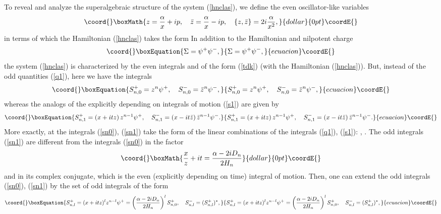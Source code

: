\documentclass[a4paper,12pt]{article}
\begin{document}
To reveal and analyze the superalgebraic structure of the
system (\ref{hnclas}), we define the even
oscillator-like variables
$$\coord{}\boxMath{
z=\frac{\alpha}{x}+ip,\quad
\bar z=\frac{\alpha}{x}-ip,\quad
\{z,\bar z\}=2i\frac{\alpha}{x^2},
}{dollar}{0pt}\coordE{}$$
in terms of which
the Hamiltonian (\ref{hnclas}) takes the form
\coordHE{}
In addition  to the Hamiltonian and nilpotent charge
\begin{equation}\coord{}\boxEquation{
\Sigma=\psi^+\psi^-,
\label{sigm}
}{
\Sigma=\psi^+\psi^-,
}{ecuacion}\coordE{}\end{equation}
the system (\ref{hnclas}) is characterized by the
even integrals \coordHE{} and \coordHE{} of the form
(\ref{tdk}) (with the Hamiltonian (\ref{hnclas})).
But, instead of the odd quantities (\ref{q1}),
here we have the integrals
\begin{equation}\coord{}\boxEquation{
S^+_{n,0}=z^n\psi^+,\quad S^-_{n,0}=
\bar z^n\psi^-,
\label{sn0}
}{
S^+_{n,0}=z^n\psi^+,\quad S^-_{n,0}=
\bar z^n\psi^-,
}{ecuacion}\coordE{}\end{equation}
whereas the analogs of
the explicitly depending on \coordHE{}
integrals of motion (\ref{s1})  are
given by
\begin{equation}\coord{}\boxEquation{
S^+_{n,1}=\left(x+itz\right)z^{n-1}\psi^+,\quad
S^-_{n,1}=\left(x-it\bar z \right)\bar{z}{}^{n-1}
\psi^-.
\label{sn1}
}{
S^+_{n,1}=\left(x+itz\right)z^{n-1}\psi^+,\quad
S^-_{n,1}=\left(x-it\bar z \right)\bar{z}{}^{n-1}
\psi^-.
}{ecuacion}\coordE{}\end{equation}
More exactly,
at \coordHE{} the integrals (\ref{sn0}),
(\ref{sn1}) take the
form of the linear combinations
of the integrals (\ref{q1}), (\ref{s1}):
\coordHE{},
\coordHE{}.
The  odd integrals (\ref{sn1})
are different from the integrals
(\ref{sn0}) in the factor
$$\coord{}\boxMath{
\frac{x}{z}+it=\frac{\alpha-2iD_n}{2H_n}
}{dollar}{0pt}\coordE{}$$
and in its complex conjugate, which is
the even (explicitly depending on time)
integral of motion.
Then,
one can extend  the odd integrals (\ref{sn0}),
(\ref{sn1})
by the set of odd integrals of the form
\begin{equation}\coord{}\boxEquation{
S_{n,l}^+=(x+itz)^lz^{n-l}\psi^+=\left(\frac{\alpha-2iD_n}{2
H_n}
\right)^lS^+_{n,0},
\quad S^-_{n,l}=(S^+_{n,l})^*,
\label{szt}
}{
S_{n,l}^+=(x+itz)^lz^{n-l}\psi^+=\left(\frac{\alpha-2iD_n}{2
H_n}
\right)^lS^+_{n,0},
\quad S^-_{n,l}=(S^+_{n,l})^*,
}{ecuacion}\coordE{}\end{equation}
\end{document}
